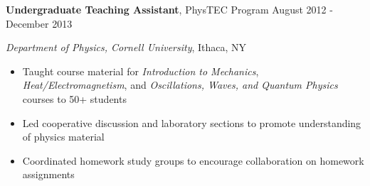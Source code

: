 
\vspace{7pt}

\textbf{Undergraduate Teaching Assistant}, PhysTEC Program \hfill August 2012 - December 2013

\textit{Department of Physics, Cornell University}, Ithaca, NY

\begin{itemize}
    \item Taught course material for \textit{Introduction to Mechanics}, \textit{Heat/Electromagnetism}, and \textit{Oscillations, Waves, \newline and Quantum Physics} courses to 50+ students
    \item Led cooperative discussion and laboratory sections to promote understanding of physics material
    \item Coordinated homework study groups to encourage collaboration on homework assignments
\end{itemize}
